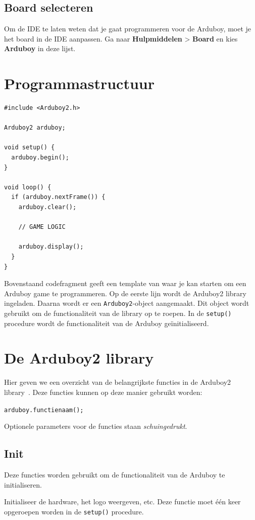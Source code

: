 \documentclass[11pt,fleqn]{book} %
\begin{document}
\subsection{Board selecteren}
Om de IDE te laten weten dat je gaat programmeren voor de Arduboy, moet je het board in de IDE aanpassen. Ga naar \textbf{Hulpmiddelen} > \textbf{Board} en kies \textbf{Arduboy} in deze lijst.

\section{Programmastructuur}

\begin{verbatim}
#include <Arduboy2.h>

Arduboy2 arduboy;

void setup() {
  arduboy.begin();
}

void loop() {
  if (arduboy.nextFrame()) {
    arduboy.clear();

    // GAME LOGIC
    
    arduboy.display();   
  }
}
\end{verbatim}
\noindent
Bovenstaand codefragment geeft een template van waar je kan starten om een Arduboy game te programmeren. Op de eerste lijn wordt de Arduboy2 library ingeladen. Daarna wordt er een \texttt{Arduboy2}-object aangemaakt. Dit object wordt gebruikt om de functionaliteit van de library op te roepen. In de \texttt{setup()} procedure wordt de functionaliteit van de Arduboy geïnitialiseerd. 

\section{De Arduboy2 library}
Hier geven we een overzicht van de belangrijkste functies in de Arduboy2 library~\cite{arduboy:lib2-doc}. Deze functies kunnen op deze manier gebruikt worden:

\begin{center}
	\texttt{arduboy.functienaam();}
\end{center}
\noindent
Optionele parameters voor de functies staan \emph{schuingedrukt}.

\subsection{Init}
Deze functies worden gebruikt om de functionaliteit van de Arduboy te initialiseren.

\begin{libf}[begin()]
	Initialiseer de hardware, het logo weergeven, etc. Deze functie moet één keer opgeroepen worden in de \texttt{setup()} procedure.
\end{libf}
\end{document}
